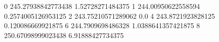 0 245.27938842773438 1.52728271484375
1 244.00950622558594 0.2574005126953125
2 243.75210571289062 0.0
4 243.8721923828125 0.120086669921875
6 244.7909698486328 1.0388641357421875
8 250.67098999023438 6.91888427734375
